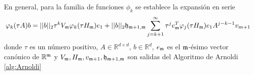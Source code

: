 En general, para la familia de funciones $\phi_k$ se establece la expansión en serie \cite{Saad92,sidje1998expokit}
\begin{equation}
\varphi_k(\tau A)b=||b||_2\tau^{k} V_{\mathfrak{m}} \varphi_k(\tau H_{\mathfrak{m}})e_1 + ||b||_2\mathfrak{h}_{\mathfrak{m}+1,\mathfrak{m}}
\sum_{j=k+1}^{\infty}\tau^{j} e_{\mathfrak{m}}^T\varphi_j(\tau H_{\mathfrak{m}})e_1A^{j-k-1}v_{m+1} \label{PHI-EXPANSION}
\end{equation}
donde $\tau$ es un número positivo, $A\in\mathbb{R}^{d\times d}$, $b\in\mathbb{R}^d$, $e_{\mathfrak{m}}$ es el $\mathfrak{m}$-ésimo vector canónico de $\mathbb{R}^{\mathfrak{m}}$ y $V_{\mathfrak{m}},H_{\mathfrak{m}},v_{\mathfrak{m}+1},\mathfrak{h}_{\mathfrak{m}+1,\mathfrak{m}}$ son salidas del Algoritmo de Arnoldi \ref{alg:Arnoldi}